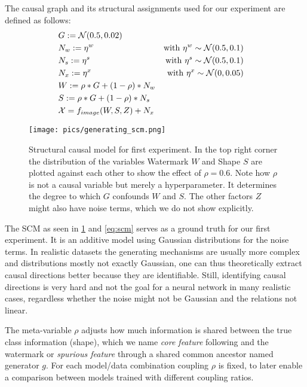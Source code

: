 The causal graph and its structural assignments used for our experiment are defined as follows: 
\begin{align}
&G:=\mathcal{N}(0.5,0.02) \notag \\ 
&N_w:=\eta^w &\mathrm{with} \  \eta^w \sim \mathcal{N}(0.5,0.1) && \notag \\ 
&N_s:=\eta^s &\mathrm{with} \  \eta^s \sim \mathcal{N}(0.5,0.1) && \notag \\ 
&N_x:=\eta^x &\mathrm{with} \  \eta^x \sim \mathcal{N}(0,0.05) && \notag \\ 
&W:=\rho * G + (1-\rho)* N_w \notag \\ 
&S:=\rho * G + (1-\rho)* N_s \notag \\ 
& \mathcal{X} = f_{image}(W, S, Z) + N_{x} &
\end{align}

\begin{figure}[H]
    \centering
    \texttt{[image: pics/generating\_scm.png]}
    \caption{Structural causal model for first experiment.
        In the top right corner the distribution of the variables Watermark $W$ and Shape $S$ are plotted against each other to show the effect of $\rho = 0.6$. Note how $\rho$ is not a causal variable but merely a hyperparameter. It determines the degree to which $G$ confounds $W$ and $S$. The other factors $Z$ might also have noise terms, which we do not show explicitly.}
    \label{fig:generating_scm}
\end{figure}

The SCM as seen in \cref{fig:generating_scm} and \cref{eq:scm} serves as a ground truth for our first experiment. It is an additive model using Gaussian distributions for the noise terms. In realistic datasets the generating mechanisms are usually more complex and distributions mostly not exactly Gaussian, one can thus theoretically extract causal directions better because they are identifiable.
Still, identifying causal directions is very hard and not the goal for a neural network in many realistic cases, regardless whether the noise might not be Gaussian and the relations not linear.

The meta-variable $\rho$ adjusts how much information is shared between the true class information (shape), which we name \textit{core feature} following \cite{Singla2022} and the watermark or \textit{spurious feature} through a shared common ancestor named generator $g$. For each model/data combination coupling $\rho$ is fixed, to later enable a comparison between models trained with different coupling ratios. 


